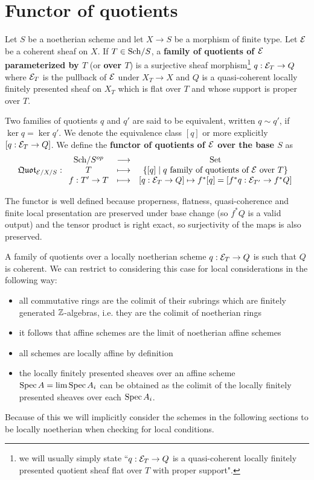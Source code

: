 \section{Functor of quotients}
\begin{definition}
Let $S$ be a noetherian scheme and let $X\to S$ be a morphism of finite type. Let $\mathcal{E}$ be a coherent sheaf on $X$. If $T\in {\mathrm{Sch}}/{S}$, a \textbf{family of quotients of $\mathcal{E}$ parameterized by $T$} (or \textbf{over $T$}) is a surjective sheaf morphism\footnote{we will usually simply state ``$q:\mathcal{E}_T\to Q$ is a quasi-coherent locally finitely presented quotient sheaf flat over $T$ with proper support".} $q:\mathcal{E}_T\to Q$ where $\mathcal{E}_T$ is the pullback of $\mathcal{E}$ under $X_T\to X$ and $Q$ is a quasi-coherent locally finitely presented sheaf on $X_T$ which is flat over $T$ and whose support is proper over $T$.

Two families of quotients $q$ and $q'$ are said to be equivalent, written $q\sim q'$, if $\ker q=\ker q'$. We denote the equivalence class $[q]$ or more explicitly $[q:\mathcal{E}_T\to Q]$. We define the \textbf{functor of quotients of $\mathcal{E}$ over the base $S$} as
\[\mathfrak{Quot}_{\mathcal{E}/X/S}:\begin{array}{ccc} {{\mathrm{Sch}}/{S}^{op}} & \longrightarrow & {\mathrm{Set}}\\ {T} & \longmapsto & {\left\{{[q]\mid q\text{ family of quotients of $\mathcal{E}$ over $T$}}\right\}}\\ {f:T'\to T} & \longmapsto & {[q:\mathcal{E}_T\to Q]\mapsto f^\ast[q]=[f^\ast q:\mathcal{E}_{T'}\to f^\ast Q]} \end{array}\]
\end{definition}

\begin{remark}
The functor is well defined because properness, flatness, quasi-coherence and finite local presentation are preserved under base change (so $f^\ast Q$ is a valid output) and the tensor product is right exact, so surjectivity of the maps is also preserved.
\end{remark}

\begin{remark}
A family of quotients over a locally noetherian scheme $q:\mathcal{E}_T\to Q$ is such that $Q$ is coherent. We can restrict to considering this case for local considerations in the following way:
\begin{itemize}
\item all commutative rings are the colimit of their subrings which are finitely generated $\mathbb{Z}$-algebras, i.e. they are the colimit of noetherian rings
\item it follows that affine schemes are the limit of noetherian affine schemes
\item all schemes are locally affine by definition
\item the locally finitely presented sheaves over an affine scheme $\mathrm{Spec}\, A=\lim \mathrm{Spec}\, A_i$ can be obtained as the colimit of the locally finitely presented sheaves over each $\mathrm{Spec}\, A_i$.
\end{itemize}
Because of this we will implicitly consider the schemes in the following sections to be locally noetherian when checking for local conditions.
\end{remark}


